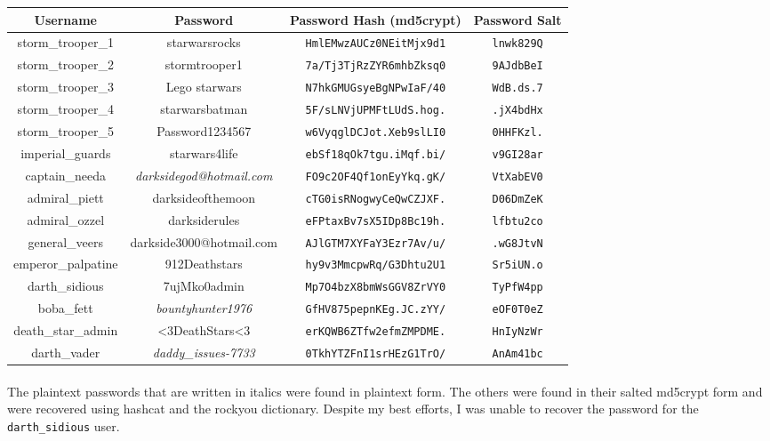 \documentclass{article}
\begin{document}
\begin{adjustwidth}{-1.5cm}{}
\begin{tabular}{ |c|c|c|c| }
\hline
\textbf{Username} & \textbf{Password} & \textbf{Password Hash (md5crypt)} & \textbf{Password Salt} \\
\hline
storm\_trooper\_1 & starwarsrocks & \texttt{HmlEMwzAUCz0NEitMjx9d1} & \texttt{lnwk829Q} \\
\hline
storm\_trooper\_2 & stormtrooper1 & \texttt{7a/Tj3TjRzZYR6mhbZksq0} & \texttt{9AJdbBeI} \\
\hline
storm\_trooper\_3 & Lego starwars & \texttt{N7hkGMUGsyeBgNPwIaF/40} & \texttt{WdB.ds.7} \\
\hline
storm\_trooper\_4 & starwarsbatman & \texttt{5F/sLNVjUPMFtLUdS.hog.} & \texttt{.jX4bdHx} \\
\hline
storm\_trooper\_5 & Password1234567 & \texttt{w6VyqglDCJot.Xeb9slLI0} & \texttt{0HHFKzl.} \\
\hline
imperial\_guards & starwars4life & \texttt{ebSf18qOk7tgu.iMqf.bi/} & \texttt{v9GI28ar} \\
\hline
captain\_needa & \emph{darksidegod@hotmail.com} & \texttt{FO9c2OF4Qf1onEyYkq.gK/} & \texttt{VtXabEV0} \\
\hline
admiral\_piett & darksideofthemoon & \texttt{cTG0isRNogwyCeQwCZJXF.} & \texttt{D06DmZeK} \\
\hline
admiral\_ozzel & darksiderules & \texttt{eFPtaxBv7sX5IDp8Bc19h.} & \texttt{lfbtu2co} \\
\hline
general\_veers & darkside3000@hotmail.com & \texttt{AJlGTM7XYFaY3Ezr7Av/u/} & \texttt{.wG8JtvN} \\
\hline
emperor\_palpatine & 912Deathstars & \texttt{hy9v3MmcpwRq/G3Dhtu2U1} & \texttt{Sr5iUN.o} \\
\hline
darth\_sidious & 7ujMko0admin & \texttt{Mp7O4bzX8bmWsGGV8ZrVY0} & \texttt{TyPfW4pp} \\
\hline
boba\_fett & \emph{bountyhunter1976} & \texttt{GfHV875pepnKEg.JC.zYY/} & \texttt{eOF0T0eZ} \\
\hline
death\_star\_admin & \textless 3DeathStars\textless 3 & \texttt{erKQWB6ZTfw2efmZMPDME.} & \texttt{HnIyNzWr} \\
\hline
darth\_vader & \emph{daddy\_issues-7733} & \texttt{0TkhYTZFnI1srHEzG1TrO/} & \texttt{AnAm41bc} \\
\hline
\end{tabular}
\end{adjustwidth}

\paragraph{}
The plaintext passwords that are written in italics were found in plaintext form.
The others were found in their salted md5crypt form and were recovered using hashcat and the rockyou dictionary.
Despite my best efforts, I was unable to recover the password for the \texttt{darth\_sidious} user.
\end{document}
